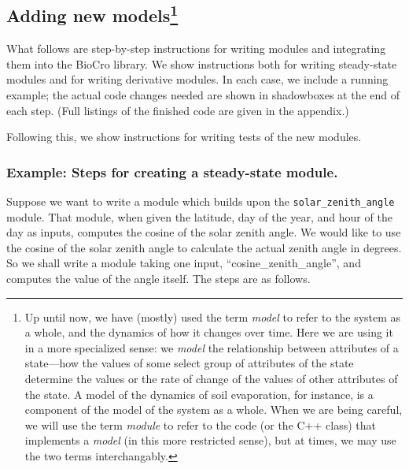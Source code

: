 \documentclass{article}\usepackage[]{graphicx}\usepackage[]{color}
\newcommand{\code}[1]{\lstinline[style=C++style]{#1}}
\begin{document}
\subsection[Adding new models]{Adding new models\footnote{Up until
  now, we have (mostly) used the term \emph{model} to refer to the
  system as a whole, and the dynamics of how it changes over time.
  Here we are using it in a more specialized sense: we \emph{model}
  the relationship between attributes of a state---how the values of
  some select group of attributes of the state determine the values or
  the rate of change of the values of other attributes of the state.
  A model of the dynamics of soil evaporation, for instance, is a
  component of the model of the system as a whole.  When we are being
  careful, we will use the term \emph{module} to refer to the code (or
  the C++ class) that implements a \emph{model} (in this more
  restricted sense), but at times, we may use the two terms
  interchangably.}}

What follows are step-by-step instructions for writing modules and
integrating them into the BioCro library.  We show instructions both
for writing steady-state modules and for writing derivative modules.
In each case, we include a running example; the actual code changes
needed are shown in shadowboxes at the end of each step.  (Full
listings of the finished code are given in the appendix.)

Following this, we show instructions for writing tests of the new
modules.

\subsubsection{Example: Steps for creating a steady-state module.}

Suppose we want to write a module which builds upon the
\code{solar_zenith_angle} module.  That module, when given the
latitude, day of the year, and hour of the day as inputs, computes the
cosine of the solar zenith angle.  We would like to use the cosine of
the solar zenith angle to calculate the actual zenith angle in
degrees.  So we shall write a module taking one input,
``cosine\_zenith\_angle'', and computes the value of the angle itself.
The steps are as follows.
\end{document}
